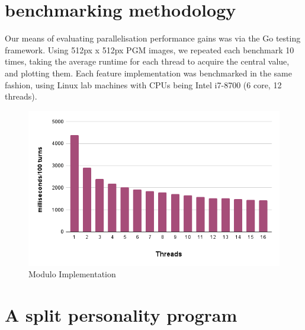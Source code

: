 \documentclass[twoside,twocolumn]{article}
\renewcommand\thesubsection{\roman{subsection}} %
\begin{document}
\section{benchmarking methodology}
Our means of evaluating parallelisation performance gains 
was via the Go testing framework. Using 512px x 512px PGM images, we 
repeated each benchmark 10 times, taking the average runtime for each thread to acquire the central value, 
and plotting them. Each feature implementation was benchmarked in the same fashion, using Linux lab machines 
with CPUs being Intel i7-8700 (6 core, 12 threads).
\renewcommand\thesubsection{\Alph{subsection}}
\begin{figure}
  \includegraphics[width=\linewidth]{modulo.png}
  \caption{Modulo Implementation}
  \label{fig:chart1}
\end{figure}

\section{A split personality program}
\end{document}
